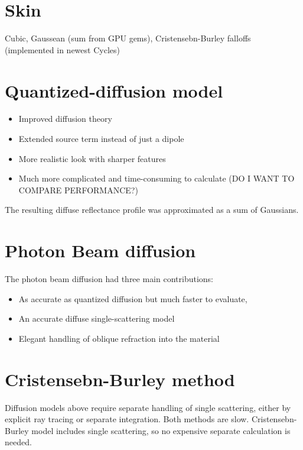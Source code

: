 \section{Skin}
Cubic, Gaussean (sum from GPU gems), Cristensebn-Burley falloffs (implemented in newest Cycles)

\section{Quantized-diffusion model \cite{D'Eon:2011:QMR:1964921.1964951}}
\begin{itemize}
\item Improved diffusion theory
\item Extended source term instead of just a dipole
\item More realistic look with sharper features
\item Much more complicated and time-consuming to calculate (DO I WANT TO COMPARE PERFORMANCE?)
\end{itemize}
The resulting diffuse reflectance profile was approximated as a sum of Gaussians.

\section{Photon Beam diffusion \cite{Habel:2013:PBD:2600890.2600896}}
The photon beam diffusion had three main contributions:
\begin{itemize}
\item As accurate as quantized diffusion but much faster to evaluate,
\item An accurate diffuse single-scattering model
\item Elegant handling of oblique refraction into the material
\end{itemize}

\section{Cristensebn-Burley method \cite{Christensen:2015:ARP:2775280.2792555}}
Diffusion models above require separate handling of single scattering, either by explicit ray tracing or separate integration.
Both methods are slow. Cristensebn-Burley model includes single scattering, so no
expensive separate calculation is needed.